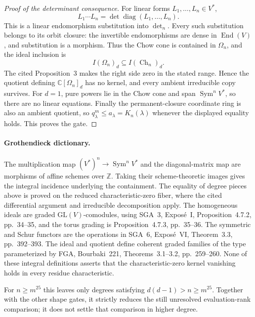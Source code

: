 \begin{proof}[Proof of the determinant consequence]
For linear forms \(L_1,\ldots,L_n\in V^*\),
\[
                     L_1\cdots L_n
                     =\det\operatorname{diag}(L_1,\ldots,L_n).
\]
This is a linear endomorphism substitution into \(\det_n\).
Every such substitution belongs to its orbit closure: the
invertible endomorphisms are dense in \(\operatorname{End}(V)\),
and substitution is a morphism. Thus the Chow cone is contained
in \(\Omega_n\), and the ideal inclusion is
\[
                     I(\Omega_n)_d\subseteq I(\operatorname{Ch}_n)_d.
\]
The cited Proposition~3 makes the right side zero in the stated
range. Hence the quotient defining \(\mathbb C[\Omega_n]_d\)
has no kernel, and every ambient irreducible copy survives.
For \(d=1\), pure powers lie in the Chow cone and span
\(\operatorname{Sym}^n V^*\), so there are no linear equations.
Finally the permanent-closure coordinate ring is also an ambient
quotient, so \(q^m_\lambda\leq a_\lambda=K_n(\lambda)\)
whenever the displayed equality holds. This proves the gate.
\end{proof}

\paragraph{Grothendieck dictionary.}
The multiplication map \((V^*)^n\to\operatorname{Sym}^n V^*\)
and the diagonal-matrix map are morphisms of affine schemes over
\(\mathbb Z\). Taking their scheme-theoretic images gives the
integral incidence underlying the containment. The equality of
degree pieces above is proved on the reduced characteristic-zero
fiber, where the cited differential argument and irreducible
decomposition apply. The homogeneous ideals are graded
\(\mathrm{GL}(V)\)-comodules, using SGA~3, Expos\'e~I,
Proposition~4.7.2, pp.~34--35, and the torus grading is
Proposition~4.7.3, pp.~35--36. The symmetric and Schur functors
are the operations in SGA~6, Expos\'e~VI, Theorem~3.3,
pp.~392--393. The ideal and quotient define coherent graded
families of the type parameterized by FGA, Bourbaki~221,
Theorems~3.1--3.2, pp.~259--260. None of these integral
definitions asserts that the characteristic-zero kernel
vanishing holds in every residue characteristic.

For \(n\geq m^{25}\) this leaves only degrees satisfying
\(d(d-1)>n\geq m^{25}\). Together with the other shape gates,
it strictly reduces the still unresolved evaluation-rank
comparison; it does not settle that comparison in higher degree.
